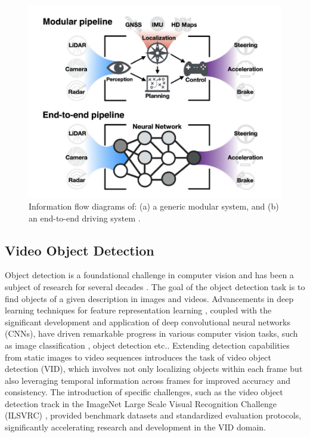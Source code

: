 \begin{figure}
    \centering
    \includegraphics[width=\textwidth]{figures/figure_background_ads_system_architecture.png}
    \caption{Information flow diagrams of: (a) a generic modular system, and (b) an end-to-end driving system \cite{yurtseverSurveyAutonomousDriving2020}.}
    \label{fig:figure_background_ads_system_architecture}
\end{figure}

\subsection{Video Object Detection} \label{Background:VideoObjectDetection}


Object detection is a foundational challenge in computer vision and has been a subject of research for several decades \cite{fischlerRepresentationMatchingPictorial1973}. The goal of the object detection task is to find objects of a given description in images and videos.
Advancements in deep learning techniques for feature representation learning \cite{hintonReducingDimensionalityData2006, lecunDeepLearning2015}, coupled with the significant development and application of deep convolutional neural networks (CNNs), have driven remarkable progress in various computer vision tasks, such as image classification \cite{}, object detection \cite{} etc..
Extending detection capabilities from static images to video sequences introduces the task of video object detection (VID), which involves not only localizing objects within each frame but also leveraging temporal information across frames for improved accuracy and consistency.
The introduction of specific challenges, such as the video object detection track in the ImageNet Large Scale Visual Recognition Challenge (ILSVRC) \cite{russakovskyImageNetLargeScale2015}, provided benchmark datasets and standardized evaluation protocols, significantly accelerating research and development in the VID domain.

